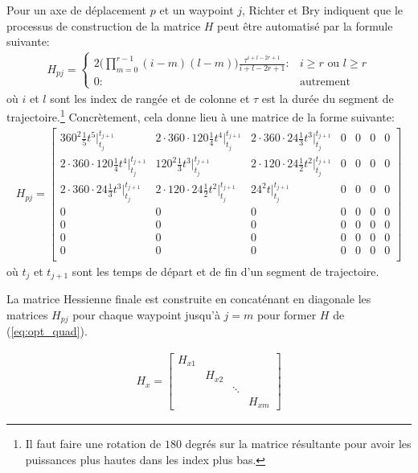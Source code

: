 Pour un axe de déplacement $p$ et un waypoint $j$, Richter et Bry \cite{Richter2016, bry2012control} indiquent que le processus de construction de la matrice $H$ peut être automatisé par la formule suivante:
\begin{align}
H_{pj} =\left\{
  \begin{array}{ll}
    2 \Big( \prod_{m = 0}^{r-1} (i-m)(l-m)\Big) \frac{\tau^{i+l-2r+1}}{i+l-2r+1}: & i \geq r \text{ ou } l \geq r \\
    0 : & \text{autrement}
  \end{array}
  \right.
\end{align}
où $i$ et $l$ sont les index de rangée et de colonne et $\tau$ est la durée du segment de trajectoire.\footnote{Il faut faire une rotation de $180$ degrés sur la matrice résultante pour avoir les puissances plus hautes dans les index plus bas.} Concrètement, cela donne lieu à une matrice de la forme suivante:
\begin{align}\label{eq:hessienne_p}
H_{pj} =
\begin{bmatrix}
    360^2 \frac{1}{5} t^5 \Big|_{t_j}^{t_{j+1}}
    		& 2 \cdot 360 \cdot 120 \frac{1}{4} t^4\Big|_{t_j}^{t_{j+1}}
    		& 2 \cdot 360 \cdot 24 \frac{1}{3} t^3\Big|_{t_j}^{t_{j+1}}
    		& 0
    		& 0
    		& 0
	    	& 0 \\
    2 \cdot 360 \cdot 120 \frac{1}{4} t^4\Big|_{t_j}^{t_{j+1}}
    		& 120^2 \frac{1}{3} t^3\Big|_{t_j}^{t_{j+1}}
    		& 2 \cdot 120 \cdot 24 \frac{1}{2}t^2 \Big|_{t_j}^{t_{j+1}} & 0 & 0 & 0 & 0\\
	2 \cdot 360 \cdot 24 \frac{1}{3} t^3\Big|_{t_j}^{t_{j+1}}
		& 2 \cdot 120 \cdot 24 \frac{1}{2}t^2 \Big|_{t_j}^{t_{j+1}}
		& 24^2 t\Big|_{t_j}^{t_{j+1}} & 0 & 0 & 0 & 0 \\
    0 & 0 & 0 & 0 & 0 & 0 & 0 \\
    0 & 0 & 0 & 0 & 0 & 0 & 0 \\
    0 & 0 & 0 & 0 & 0 & 0 & 0 \\
    0 & 0 & 0 & 0 & 0 & 0 & 0 \\
\end{bmatrix}
\end{align}
où $t_j$ et $t_{j+1}$ sont les temps de départ et de fin d'un segment de trajectoire.


La matrice Hessienne finale est construite en concaténant en diagonale les matrices $H_{pj}$ pour chaque waypoint jusqu'à $j=m$ pour former $H$ de (\ref{eq:opt_quad}).

\begin{align}
H_x=
\begin{bmatrix}
	H_{x1} \\
	&	H_{x2} \\
	&	&		\ddots \\
	&	&		&		H_{xm}
\end{bmatrix}
\end{align}

